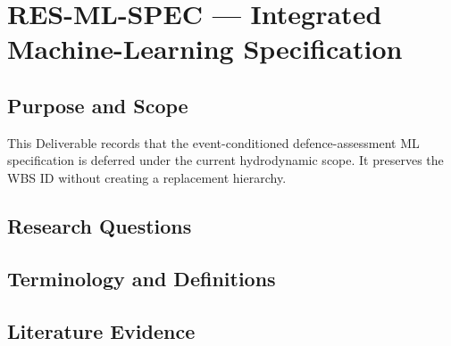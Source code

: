 
\section{RES-ML-SPEC --- Integrated Machine-Learning Specification}
\label{sec:res-ml-spec}

\subsection{Purpose and Scope}
\label{sec:res-ml-spec-purpose}

This Deliverable records that the event-conditioned defence-assessment
ML specification is deferred under the current hydrodynamic scope. It
preserves the WBS ID without creating a replacement hierarchy.

\subsection{Research Questions}
\label{sec:res-ml-spec-research-questions}


\subsection{Terminology and Definitions}
\label{sec:res-ml-spec-definitions}


\subsection{Literature Evidence}
\label{sec:res-ml-spec-literature-evidence}

%

